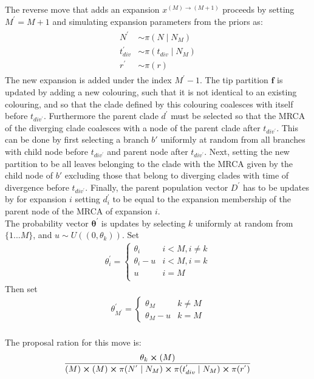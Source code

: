 \documentclass{report}
\theoremstyle{definition}
\begin{document}
The reverse move that adds an expansion $x^{(M)\to(M+1)}$ 
proceeds by setting $M^{'} = M+1$ and simulating expansion parameters from the priors as:
\begin{gather}
\begin{aligned}
N^{'} &\sim \pi(N\mid N_{M})\\
t^{'}_{div} &\sim \pi(t_{div}\mid N_{M})\\
r^{'} &\sim \pi(r)
\end{aligned}
\end{gather}
The new expansion is added under the index $M^{'}-1$. The tip partition $\mathbf{f}$ is updated by adding a new colouring, such that it is not identical to an existing colouring, and so that the clade defined by this colouring coalesces with itself before $t_{div^{'}}$. Furthermore the parent clade $d^{'}$ must be selected so that the MRCA of the diverging clade coalesces with a node of the parent clade after $t_{div^{'}}$. This can be done by first selecting a branch $b'$ uniformly at random from all branches with child node before $t_{div^{'}}$ and parent node after $t_{div^{'}}$. Next, setting the new partition to be all leaves belonging to the clade with the MRCA given by the child node of $b'$ excluding those that belong to diverging clades with time of divergence before $t_{div^{'}}$. Finally, the parent population vector $D^{'}$ has to be updates by for expansion $i$ setting $d_i^{'}$ to be equal to the expansion membership of the parent node of the MRCA of expansion $i$.\\
The probability vector $\pmb\theta^{'}$ is updates by selecting $k$ uniformly at random from $\{1...M\}$, and $u\sim U((0, \theta_k))$. Set 
\begin{gather}
  \theta^{'}_i = 
  \begin{cases} 
      \theta_i & i < M, i \neq k \\
      \theta_i-u& i < M, i = k \\
      u & i = M\\
  \end{cases}
\end{gather}
Then set 
\begin{gather}
  \theta^{'}_{M^{'}} = 
  \begin{cases} 
      \theta_M & k \neq M \\
      \theta_M-u& k=M
  \end{cases}
\end{gather}\\
The proposal ration for this move is:
\begin{gather}
\frac{\theta_k\cross(M)}{(M)\cross(M)\cross\pi(N^{'}\mid N_{M})\cross\pi(t^{'}_{div}\mid N_{M})\cross\pi(r^{'})}
\end{gather}
\end{document}
